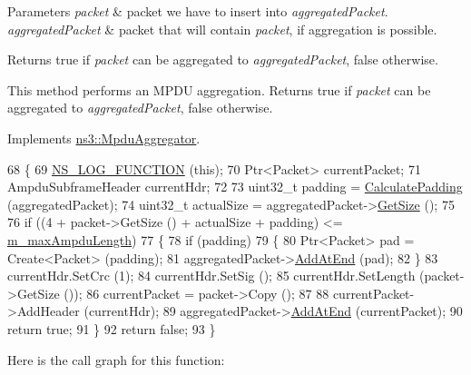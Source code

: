 \begin{DoxyParams}{Parameters}
{\em packet} & packet we have to insert into {\itshape aggregated\+Packet}. \\
\hline
{\em aggregated\+Packet} & packet that will contain {\itshape packet}, if aggregation is possible.\\
\hline
\end{DoxyParams}
\begin{DoxyReturn}{Returns}
true if {\itshape packet} can be aggregated to {\itshape aggregated\+Packet}, false otherwise.
\end{DoxyReturn}
This method performs an M\+P\+DU aggregation. Returns true if {\itshape packet} can be aggregated to {\itshape aggregated\+Packet}, false otherwise. 

Implements \hyperlink{classns3_1_1MpduAggregator_a8452ad0dca5d5a0fef52991c4f4cf610}{ns3\+::\+Mpdu\+Aggregator}.


\begin{DoxyCode}
68 \{
69   \hyperlink{log-macros-disabled_8h_a90b90d5bad1f39cb1b64923ea94c0761}{NS\_LOG\_FUNCTION} (\textcolor{keyword}{this});
70   Ptr<Packet> currentPacket;
71   AmpduSubframeHeader currentHdr;
72 
73   uint32\_t padding = \hyperlink{classns3_1_1MpduStandardAggregator_af00b3fee23a51d256dc0c2df6f488a93}{CalculatePadding} (aggregatedPacket);
74   uint32\_t actualSize = aggregatedPacket->\hyperlink{classns3_1_1Packet_a462855c9929954d4301a4edfe55f4f1c}{GetSize} ();
75 
76   \textcolor{keywordflow}{if} ((4 + packet->GetSize () + actualSize + padding) <= \hyperlink{classns3_1_1MpduStandardAggregator_afe4089ec8e77ce0a35c92803131ffc5f}{m\_maxAmpduLength})
77     \{
78       \textcolor{keywordflow}{if} (padding)
79         \{
80           Ptr<Packet> pad = Create<Packet> (padding);
81           aggregatedPacket->\hyperlink{classns3_1_1Packet_a14ec3d4250b425468764de58f5837b6b}{AddAtEnd} (pad);
82         \}
83       currentHdr.SetCrc (1);
84       currentHdr.SetSig ();
85       currentHdr.SetLength (packet->GetSize ());
86       currentPacket = packet->Copy ();
87 
88       currentPacket->AddHeader (currentHdr);
89       aggregatedPacket->\hyperlink{classns3_1_1Packet_a14ec3d4250b425468764de58f5837b6b}{AddAtEnd} (currentPacket);
90       \textcolor{keywordflow}{return} \textcolor{keyword}{true};
91     \}
92   \textcolor{keywordflow}{return} \textcolor{keyword}{false};
93 \}
\end{DoxyCode}


Here is the call graph for this function\+:


